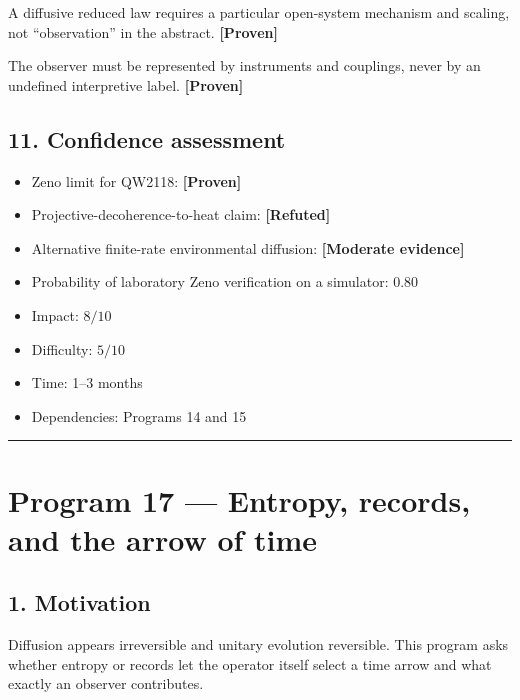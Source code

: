 \documentclass[11pt,a4paper,openany]{report}
\newcommand{\statusProven}{\textcolor{fingreen}{[Proven]}}
\newcommand{\statusModerate}{\textcolor{finviolet}{[Moderate evidence]}}
\newcommand{\statusRefuted}{\textcolor{finred}{[Refuted]}}
\begin{document}
A diffusive reduced law requires a particular open-system mechanism and scaling, not “observation” in the abstract. \textbf{\statusProven{}}

The observer must be represented by instruments and couplings, never by an undefined interpretive label. \textbf{\statusProven{}}

\section{11. Confidence assessment}

\begin{itemize}
\item 
Zeno limit for QW2118: \textbf{\statusProven{}}

\item 
Projective-decoherence-to-heat claim: \textbf{\statusRefuted{}}

\item 
Alternative finite-rate environmental diffusion: \textbf{\statusModerate{}}

\item 
Probability of laboratory Zeno verification on a simulator: \(0.80\)

\item 
Impact: \(8/10\)

\item 
Difficulty: \(5/10\)

\item 
Time: 1–3 months

\item 
Dependencies: Programs 14 and 15

\end{itemize}

\par\medskip\hrule\medskip

\chapter{Program 17 — Entropy, records, and the arrow of time}

\section{1. Motivation}

Diffusion appears irreversible and unitary evolution reversible. This program asks whether entropy or records let the operator itself select a time arrow and what exactly an observer contributes.
\end{document}
